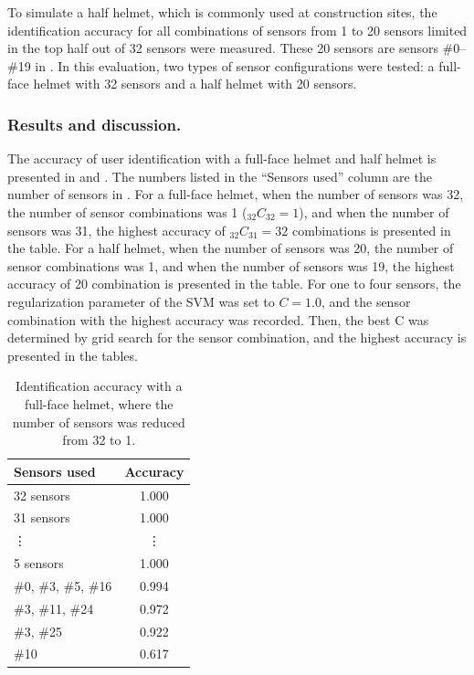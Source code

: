 \documentclass[english,preprint,JIP]{ipsj}
\begin{document}
To simulate a half helmet, which is commonly used at construction sites, the identification accuracy for all combinations of sensors from 1 to 20 sensors limited in the top half out of 32 sensors were measured. These 20 sensors are sensors \#0--\#19 in . In this evaluation, two types of sensor configurations were tested: a full-face helmet with 32 sensors and a half helmet with 20 sensors.


\subsubsection{Results and discussion.}
The accuracy of user identification with a full-face helmet and half helmet is presented in  and . The numbers listed in the ``Sensors used'' column are the number of sensors in . For a full-face helmet, when the number of sensors was 32, the number of sensor combinations was 1 ($_{32}C_{32}=1$), and when the number of sensors was 31, the highest accuracy of $_{32}C_{31}=32$ combinations is presented in the table. For a half helmet, when the number of sensors was 20, the number of sensor combinations was 1, and when the number of sensors was 19, the highest accuracy of 20 combination is presented in the table. For one to four sensors, the regularization parameter of the SVM was set to $C=1.0$, and the sensor combination with the highest accuracy was recorded. Then, the best C was determined by grid search for the sensor combination, and the highest accuracy is presented in the tables.\par


\begin{table}[!t]
\centering
  \caption{Identification accuracy with a full-face helmet, where the number of sensors was reduced from 32 to 1.}
    \label{tab:full_num}
  \begin{tabular}{l|c} \hline\hline
    Sensors used & Accuracy \\ \hline
    32 sensors & 1.000 \\
    31 sensors & 1.000 \\
    \vdots & \vdots \\
    5 sensors & 1.000 \\
    $\#$0, $\#$3, $\#$5, $\#$16 & 0.994 \\
    $\#$3, $\#$11, $\#$24       & 0.972 \\
    $\#$3, $\#$25               & 0.922 \\
    $\#$10                      & 0.617 \\ \hline
  \end{tabular}
\end{table}
\end{document}

